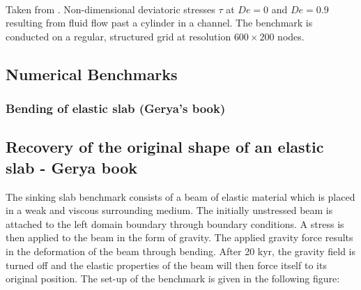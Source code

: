 \begin{center}
\\
{\captionfont Taken from \textcite{bepo10}.
Non-dimensional deviatoric stresses $\tau$ at $De = 0$ and $De = 0.9$ 
resulting from fluid flow past a cylinder in a channel. The benchmark is conducted
on a regular, structured grid at resolution $600 \times 200$ nodes.
}
\end{center}



\subsection{Numerical Benchmarks}

\subsubsection{Bending of elastic slab (Gerya's book)}


\subsection{Recovery of the original shape of an elastic slab - Gerya book}

The sinking slab benchmark consists of a beam of elastic material which is placed 
in a weak and viscous surrounding medium. The initially unstressed beam is attached to the left domain boundary through boundary conditions. A stress is then applied to the beam in the form of gravity. The applied gravity force results in the deformation of the beam through bending. After 20 kyr, the gravity field is turned off and the elastic properties of the beam will then force itself to its original position. The set-up of the benchmark is given in the following figure:

